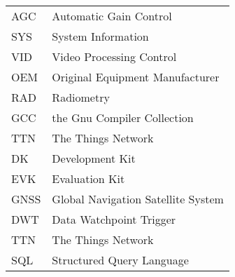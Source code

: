 \begin{flushleft}
\begin{longtable}[l]{p{2.5cm}l}
        AGC   & Automatic Gain Control\\
        SYS   & System Information\\
        VID   & Video Processing Control\\
        OEM   & Original Equipment Manufacturer\\
        RAD   & Radiometry\\
        GCC   & the Gnu Compiler Collection\\
        TTN   & The Things Network\\
        DK    & Development Kit\\
        EVK   & Evaluation Kit\\
        GNSS  & Global Navigation Satellite System\\
        DWT   & Data Watchpoint Trigger\\
        TTN   & The Things Network\\
        SQL   &  Structured Query Language\\
\end{longtable}
\end{flushleft}
\endgroup

\newpage
